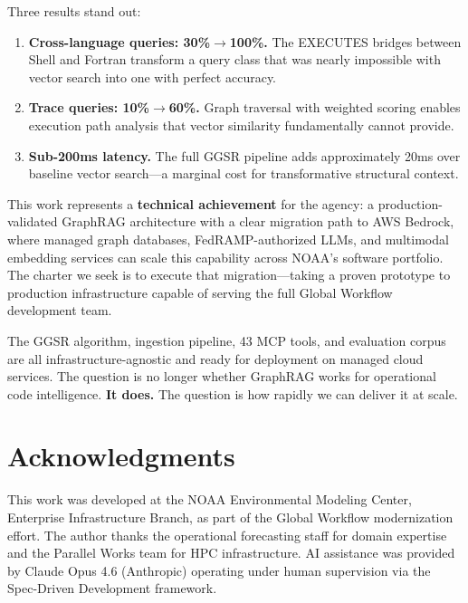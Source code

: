 \documentclass[11pt,letterpaper]{article}
\begin{document}
Three results stand out:

\begin{enumerate}
    \item \textbf{Cross-language queries: 30\%$\to$100\%.} The EXECUTES
          bridges between Shell and Fortran transform a query class that
          was nearly impossible with vector search into one with perfect
          accuracy.
    \item \textbf{Trace queries: 10\%$\to$60\%.} Graph traversal
          with weighted scoring enables execution path analysis that
          vector similarity fundamentally cannot provide.
    \item \textbf{Sub-200ms latency.} The full GGSR pipeline adds
          approximately 20ms over baseline vector search---a marginal
          cost for transformative structural context.
\end{enumerate}

This work represents a \textbf{technical achievement} for the agency:
a production-validated GraphRAG architecture with a clear migration path
to AWS Bedrock, where managed graph databases, FedRAMP-authorized LLMs,
and multimodal embedding services can scale this capability across
NOAA's software portfolio. The charter we seek is to execute that
migration---taking a proven prototype to production infrastructure
capable of serving the full Global Workflow development team.

The GGSR algorithm, ingestion pipeline, 43 MCP tools, and evaluation
corpus are all infrastructure-agnostic and ready for deployment on
managed cloud services. The question is no longer whether GraphRAG
works for operational code intelligence. \textbf{It does.} The question
is how rapidly we can deliver it at scale.

\section*{Acknowledgments}

This work was developed at the NOAA Environmental Modeling Center,
Enterprise Infrastructure Branch, as part of the Global Workflow
modernization effort. The author thanks the operational forecasting
staff for domain expertise and the Parallel Works team for HPC
infrastructure. AI assistance was provided by Claude Opus 4.6
(Anthropic) operating under human supervision via the Spec-Driven
Development framework.
\end{document}
